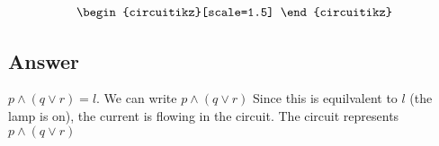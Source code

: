 \documentclass[17pt]{extarticle}
\begin{document}
\begin{fleqn}
\begin{equation}
\begin{alignedat}{4}
\begin{circuitikz}[scale=1.5]
\end{circuitikz}
\end{alignedat}
\end{equation}
\quad
\vspace*{-5mm}


\subsection*{Answer}
$p \wedge (q \vee r) = l$. We can write $p \wedge (q \vee r)$ Since this is equilvalent to $l$ (the lamp is on), the current is flowing in the circuit. The circuit represents $p \wedge (q \vee r)$



\end{fleqn}
\end{document}
